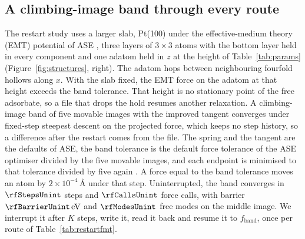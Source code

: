 \documentclass[preprint,12pt]{elsarticle}
\begin{document}
\subsection{A climbing-image band through every route} The restart study
uses a larger slab, Pt(100) under the effective-medium theory (EMT)
potential of ASE \cite{jacobsenSemiempiricalEffectiveMedium1996}, three
layers of \(3\times3\) atoms with the bottom layer held in every
component and one adatom held in \(z\) at the height of
Table~\ref{tab:params} (Figure~\ref{fig:structures}, right).
The adatom hops between neighbouring fourfold hollows along \(x\).
With the slab fixed, the EMT force on the adatom at that height exceeds
the band tolerance.
That height is no stationary point of the free adsorbate, so a file that
drops the hold resumes another relaxation.
A climbing-image band of five movable images with the improved tangent
\cite{henkelmanClimbingImageNudged2000,henkelmanImprovedTangentEstimate2000}
converges under fixed-step steepest descent on the projected force,
which keeps no step history, so a difference after the restart comes
from the file.
The spring and the tangent are the defaults of ASE, the band tolerance
is the default force tolerance of the ASE optimiser divided by the five
movable images, and each endpoint is minimised to that tolerance divided
by five again \cite{larsenAtomicSimulationEnvironmenta2017}.
A force equal to the band tolerance moves an atom by
\(2\times 10^{-4}\,\text{\AA}\) under that step.
Uninterrupted, the band converges in \(\rfStepsUnint\) steps and
\(\rfCallsUnint\) force calls, with barrier
\(\rfBarrierUnint\,\mathrm{eV}\) and \(\rfModesUnint\) free modes on the
middle image.
We interrupt it after \(K\) steps, write it, read it back and resume it
to \(f_{\mathrm{band}}\), once per route of Table~\ref{tab:restartfmt}.
\end{document}
